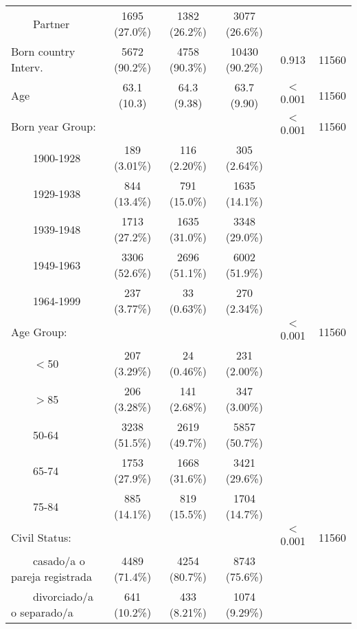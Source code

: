 \documentclass[a4paper,12pt, titlepage]{article}\usepackage[]{graphicx}\usepackage[]{color}
\begin{document}
\begin{landscape}
\begin{small}
\begin{longtable}{lccccc}
$\qquad$Partner &    1695 (27.0\%)     &    1382 (26.2\%)     &    3077 (26.6\%)     &           &      \\ 
Born country Interv. &    5672 (90.2\%)     &    4758 (90.3\%)     &    10430 (90.2\%)    &   0.913   & 11560\\ 
Age &     63.1 (10.3)     &     64.3 (9.38)     &     63.7 (9.90)     &  $<$0.001   & 11560\\ 
Born year Group: &                     &                     &                     &  $<$0.001   & 11560\\ 
$\qquad$1900-1928 &     189 (3.01\%)     &     116 (2.20\%)     &     305 (2.64\%)     &           &      \\ 
$\qquad$1929-1938 &     844 (13.4\%)     &     791 (15.0\%)     &    1635 (14.1\%)     &           &      \\ 
$\qquad$1939-1948 &    1713 (27.2\%)     &    1635 (31.0\%)     &    3348 (29.0\%)     &           &      \\ 
$\qquad$1949-1963 &    3306 (52.6\%)     &    2696 (51.1\%)     &    6002 (51.9\%)     &           &      \\ 
$\qquad$1964-1999 &     237 (3.77\%)     &     33 (0.63\%)      &     270 (2.34\%)     &           &      \\ 
Age Group: &                     &                     &                     &  $<$0.001   & 11560\\ 
$\qquad$$<$50 &     207 (3.29\%)     &     24 (0.46\%)      &     231 (2.00\%)     &           &      \\ 
$\qquad$$>$85 &     206 (3.28\%)     &     141 (2.68\%)     &     347 (3.00\%)     &           &      \\ 
$\qquad$50-64 &    3238 (51.5\%)     &    2619 (49.7\%)     &    5857 (50.7\%)     &           &      \\ 
$\qquad$65-74 &    1753 (27.9\%)     &    1668 (31.6\%)     &    3421 (29.6\%)     &           &      \\ 
$\qquad$75-84 &     885 (14.1\%)     &     819 (15.5\%)     &    1704 (14.7\%)     &           &      \\ 
Civil Status: &                     &                     &                     &  $<$0.001   & 11560\\ 
$\qquad$casado‎/a o pareja registrada &    4489 (71.4\%)     &    4254 (80.7\%)     &    8743 (75.6\%)     &           &      \\ 
$\qquad$divorciado‎/a o separado‎/a &     641 (10.2\%)     &     433 (8.21\%)     &    1074 (9.29\%)     &           &      \\ 

\end{longtable}
\end{small}
\end{landscape}
\end{document}
